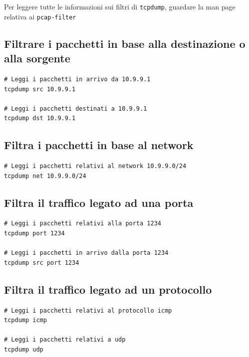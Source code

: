 \documentclass[a4paper]{report}
\newenvironment{info}{\begin{tcolorbox}[fonttitle=\sffamily\bfseries\large,title=Info,colframe=blue!75!white]}{\end{tcolorbox}}
\newenvironment{code}{\begin{tcolorbox}[size=small]}{\end{tcolorbox}}
\begin{document}
\begin{info}
	Per leggere tutte le informazioni sui filtri di \texttt{tcpdump}, guardare la man page relativa ai \texttt{pcap-filter}
\end{info}

\subsection{Filtrare i pacchetti in base alla destinazione o alla sorgente}

\begin{code}
\begin{lstlisting}
# Leggi i pacchetti in arrivo da 10.9.9.1
tcpdump src 10.9.9.1

# Leggi i pacchetti destinati a 10.9.9.1
tcpdump dst 10.9.9.1
\end{lstlisting}
\end{code}

\subsection{Filtra i pacchetti in base al network}

\begin{code}
\begin{lstlisting}
# Leggi i pacchetti relativi al network 10.9.9.0/24
tcpdump net 10.9.9.0/24
\end{lstlisting}
\end{code}

\subsection{Filtra il traffico legato ad una porta}
\begin{code}
\begin{lstlisting}
# Leggi i pacchetti relativi alla porta 1234
tcpdump port 1234

# Leggi i pacchetti in arrivo dalla porta 1234
tcpdump src port 1234
\end{lstlisting}
\end{code}

\subsection{Filtra il traffico legato ad un protocollo}
\begin{code}
\begin{lstlisting}
# Leggi i pacchetti relativi al protocollo icmp
tcpdump icmp

# Leggi i pacchetti relativi a udp
tcpdump udp
\end{lstlisting}
\end{code}
\end{document}
